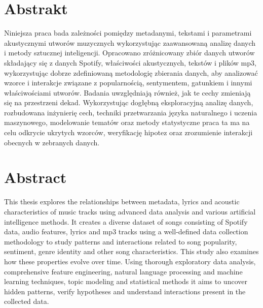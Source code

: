 \documentclass[oneside, 12pt]{book}
\begin{document}
\thispagestyle{empty}





\chapter*{Abstrakt}
Niniejsza praca bada zależności pomiędzy metadanymi, tekstami i parametrami
akustycznymi utworów muzycznych wykorzystując zaawansowaną analizę danych i
metody sztucznej inteligencji. Opracowano zróżnicowany zbiór danych utworów
składający się z danych Spotify, właściwości akustycznych, tekstów i plików
mp3, wykorzystując dobrze zdefiniowaną metodologię zbierania danych, aby
analizować wzorce i interakcje związane z popularnością, sentymentem, gatunkiem
i innymi właściwościami utworów. Badania uwzględniają również, jak te cechy
zmieniają się na przestrzeni dekad. Wykorzystując dogłębną eksploracyjną
analizę danych, rozbudowana inżynierię cech, techniki przetwarzania języka
naturalnego i uczenia maszynowego, modelowanie tematów oraz metody statystyczne
praca ta ma na celu odkrycie ukrytych wzorców, weryfikację hipotez oraz
zrozumienie interakcji obecnych w zebranych danych.


\chapter*{Abstract}
This thesis explores the relationships between metadata, lyrics and acoustic
characteristics of music tracks using advanced data analysis and various
artificial intelligence methods. It creates a diverse dataset of songs
consisting of Spotify data, audio features, lyrics and mp3 tracks using a
well-defined data collection methodology to study patterns and interactions
related to song popularity, sentiment, genre identity and other song
characteristics. This study also examines how these properties evolve over
time. Using thorough exploratory data analysis, comprehensive feature
engineering, natural language processing and machine learning techniques, topic
modeling and statistical methods it aims to uncover hidden patterns, verify
hypotheses and understand interactions present in the collected data.
\end{document}
